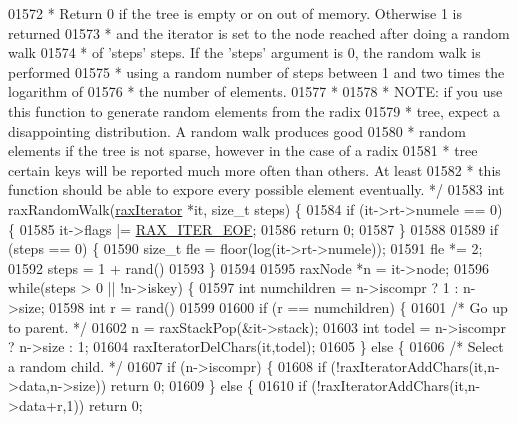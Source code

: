 \begin{DoxyCode}
{{{{{{{{{{{{{{{{{{{{{{{{01572 \textcolor{comment}{ * Return 0 if the tree is empty or on out of memory. Otherwise 1 is returned}
01573 \textcolor{comment}{ * and the iterator is set to the node reached after doing a random walk}
01574 \textcolor{comment}{ * of 'steps' steps. If the 'steps' argument is 0, the random walk is performed}
01575 \textcolor{comment}{ * using a random number of steps between 1 and two times the logarithm of}
01576 \textcolor{comment}{ * the number of elements.}
01577 \textcolor{comment}{ *}
01578 \textcolor{comment}{ * NOTE: if you use this function to generate random elements from the radix}
01579 \textcolor{comment}{ * tree, expect a disappointing distribution. A random walk produces good}
01580 \textcolor{comment}{ * random elements if the tree is not sparse, however in the case of a radix}
01581 \textcolor{comment}{ * tree certain keys will be reported much more often than others. At least}
01582 \textcolor{comment}{ * this function should be able to expore every possible element eventually. */}
01583 \textcolor{keywordtype}{int} raxRandomWalk(\hyperlink{structraxIterator}{raxIterator} *it, size\_t steps) \{
01584     \textcolor{keywordflow}{if} (it->rt->numele == 0) \{
01585         it->flags |= \hyperlink{rax_8h_a4fb08a914b84ba0a39daa86297176e1c}{RAX\_ITER\_EOF};
01586         \textcolor{keywordflow}{return} 0;
01587     \}
01588 
01589     \textcolor{keywordflow}{if} (steps == 0) \{
01590         size\_t fle = floor(log(it->rt->numele));
01591         fle *= 2;
01592         steps = 1 + rand() %
01593     \}
01594 
01595     raxNode *n = it->node;
01596     \textcolor{keywordflow}{while}(steps > 0 || !n->iskey) \{
01597         \textcolor{keywordtype}{int} numchildren = n->iscompr ? 1 : n->size;
01598         \textcolor{keywordtype}{int} r = rand() %
01599 
01600         \textcolor{keywordflow}{if} (r == numchildren) \{
01601             \textcolor{comment}{/* Go up to parent. */}
01602             n = raxStackPop(&it->stack);
01603             \textcolor{keywordtype}{int} todel = n->iscompr ? n->size : 1;
01604             raxIteratorDelChars(it,todel);
01605         \} \textcolor{keywordflow}{else} \{
01606             \textcolor{comment}{/* Select a random child. */}
01607             \textcolor{keywordflow}{if} (n->iscompr) \{
01608                 \textcolor{keywordflow}{if} (!raxIteratorAddChars(it,n->data,n->size)) \textcolor{keywordflow}{return} 0;
01609             \} \textcolor{keywordflow}{else} \{
01610                 \textcolor{keywordflow}{if} (!raxIteratorAddChars(it,n->data+r,1)) \textcolor{keywordflow}{return} 0;
}}}}}}}}}}}}}}}}}}}}}}}}
\end{DoxyCode}
